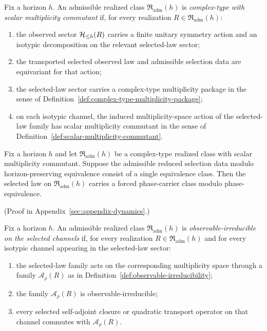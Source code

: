 \begin{definition}
\label{def:complex-type-realized-class}
Fix a horizon $h$. An admissible realized class
$\mathfrak R_{\mathrm{adm}}(h)$ is \emph{complex-type with scalar multiplicity
commutant} if, for every realization $R\in\mathfrak R_{\mathrm{adm}}(h)$:
\begin{enumerate}[label=(\roman*), leftmargin=2em, itemsep=0.2em]
\item the observed sector $\mathcal{H}_{\le h}(R)$ carries a finite unitary symmetry
      action and an isotypic decomposition on the relevant selected-law sector;
\item the transported selected observed law and admissible selection data are
      equivariant for that action;
\item the selected-law sector carries a complex-type multiplicity package in
      the sense of Definition~\ref{def:complex-type-multiplicity-package};
\item on each isotypic channel, the induced multiplicity-space action of the
      selected-law family has scalar multiplicity commutant in the sense of
      Definition~\ref{def:scalar-multiplicity-commutant}.
\end{enumerate}
\end{definition}

\begin{corollary}
\label{cor:realized-phase-class-forcing}
Fix a horizon $h$ and let $\mathfrak R_{\mathrm{adm}}(h)$ be a complex-type
realized class with scalar multiplicity commutant. Suppose the admissible
reduced selection data modulo horizon-preserving equivalence consist of a
single equivalence class. Then the selected law on
$\mathfrak R_{\mathrm{adm}}(h)$ carries a forced phase-carrier class modulo
phase-equivalence.
\end{corollary}

(Proof in Appendix~\ref{sec:appendix-dynamics}.)

\begin{definition}
\label{def:observable-irreducible-realized-class}
Fix a horizon $h$. An admissible realized class
$\mathfrak R_{\mathrm{adm}}(h)$ is \emph{observable-irreducible on the selected
channels} if, for every realization $R\in\mathfrak R_{\mathrm{adm}}(h)$ and
for every isotypic channel appearing in the selected-law sector:
\begin{enumerate}[label=(\roman*), leftmargin=2em, itemsep=0.2em]
\item the selected-law family acts on the corresponding multiplicity space
      through a family $\mathcal A_{\rho}(R)$ as in
      Definition~\ref{def:observable-irreducibility};
\item the family $\mathcal A_{\rho}(R)$ is observable-irreducible;
\item every selected self-adjoint closure or quadratic transport operator on
      that channel commutes with $\mathcal A_{\rho}(R)$.
\end{enumerate}
\end{definition}

